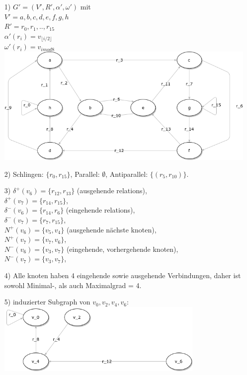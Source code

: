 \documentclass{scrartcl}
\begin{document}
\begin{itemize}
    \item[1)] $G' = (V', R', \alpha', \omega') $ mit \\
        $V' = {a, b, c, d, e, f, g, h}$ \\
        $R' = {r_0, r_1, .., r_{15}}$ \\
        $\alpha'(r_i) = v_{\lfloor i/2 \rfloor}$ \\
        $\omega'(r_i) = v_{i  mod  8}$ \\
        \includegraphics[width=14cm]{yellow_graph.png}
    \item[2)] Schlingen: $\{r_0, r_{15}\}$,
        Parallel: $\emptyset$,
        Antiparallel: $\{ (r_5, r_{10}) \}$.
    \item[3)]
        $\delta^+(v_6) = \{r_{12}, r_{13} \}$ (ausgehende relations), \\
        $\delta^+(v_7) = \{r_{14}, r_{15} \}$, \\
        $\delta^-(v_6) = \{r_{14}, r_{6} \}$ (eingehende relations), \\
        $\delta^-(v_7) = \{r_{7}, r_{15} \}$, \\
        $N^+(v_6) = \{ v_5, v_4\}$ (ausgehende nächste knoten), \\
        $N^+(v_7) = \{ v_7, v_6\}$, \\
        $N^-(v_6) = \{ v_3, v_7\}$ (eingehende, vorhergehende knoten), \\
        $N^-(v_7) = \{ v_3, v_7\}$, \\
    \item[4)] Alle knoten haben 4 eingehende sowie ausgehende Verbindungen,
        daher ist sowohl Minimal-, als auch Maximalgrad = 4.
    \item[5)] induzierter Subgraph von $v_0, v_2, v_4, v_6$: \\
        \includegraphics[width=10cm]{induced_sub_graph.png}
\end{itemize}
\end{document}
